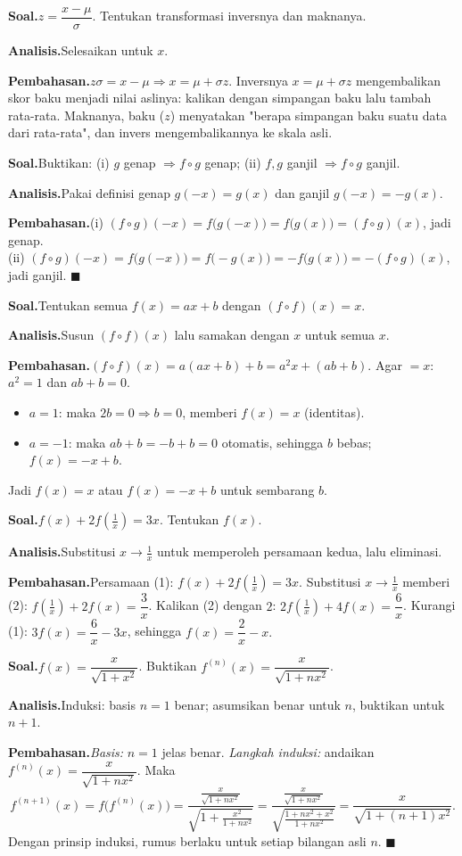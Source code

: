 \documentclass[11pt,a4paper]{report}
\theoremstyle{gaya}
\newcommand{\knomor}[1]{\par\medskip\noindent{\bfseries\color{ungu}#1}\par\nopagebreak}
\newcommand{\ksoal}{\noindent\textbf{\color{biru}Soal.}\space}
\newcommand{\kanalisis}{\par\noindent\textbf{\color{oranye}Analisis.}\space}
\newcommand{\kbahas}{\par\noindent\textbf{\color{hijau}Pembahasan.}\space}
\newcommand{\kbagian}[1]{\par\medskip\noindent{\large\bfseries\color{biru}#1}\par\smallskip}
\begin{document}
\knomor{D.4}
\ksoal $z=\dfrac{x-\mu}{\sigma}$. Tentukan transformasi inversnya dan maknanya.
\kanalisis Selesaikan untuk $x$.
\kbahas $z\sigma=x-\mu\Rightarrow x=\mu+\sigma z$. Inversnya $x=\mu+\sigma z$ mengembalikan skor baku menjadi nilai aslinya: kalikan dengan simpangan baku lalu tambah rata-rata. Maknanya, baku ($z$) menyatakan "berapa simpangan baku suatu data dari rata-rata", dan invers mengembalikannya ke skala asli.

\knomor{D.5}
\ksoal Buktikan: (i) $g$ genap $\Rightarrow f\circ g$ genap; (ii) $f,g$ ganjil $\Rightarrow f\circ g$ ganjil.
\kanalisis Pakai definisi genap $g(-x)=g(x)$ dan ganjil $g(-x)=-g(x)$.
\kbahas (i) $(f\circ g)(-x)=f\big(g(-x)\big)=f\big(g(x)\big)=(f\circ g)(x)$, jadi genap. \\
(ii) $(f\circ g)(-x)=f\big(g(-x)\big)=f\big(-g(x)\big)=-f\big(g(x)\big)=-(f\circ g)(x)$, jadi ganjil. $\blacksquare$

\kbagian{Challenge Corner}

\knomor{1}
\ksoal Tentukan semua $f(x)=ax+b$ dengan $(f\circ f)(x)=x$.
\kanalisis Susun $(f\circ f)(x)$ lalu samakan dengan $x$ untuk semua $x$.
\kbahas $(f\circ f)(x)=a(ax+b)+b=a^2x+(ab+b)$. Agar $=x$: $a^2=1$ dan $ab+b=0$.
\begin{itemize}[leftmargin=*,topsep=2pt]
  \item $a=1$: maka $2b=0\Rightarrow b=0$, memberi $f(x)=x$ (identitas).
  \item $a=-1$: maka $ab+b=-b+b=0$ otomatis, sehingga $b$ bebas; $f(x)=-x+b$.
\end{itemize}
Jadi $f(x)=x$ atau $f(x)=-x+b$ untuk sembarang $b$.

\knomor{2}
\ksoal $f(x)+2f\!\left(\tfrac1x\right)=3x$. Tentukan $f(x)$.
\kanalisis Substitusi $x\to\tfrac1x$ untuk memperoleh persamaan kedua, lalu eliminasi.
\kbahas Persamaan (1): $f(x)+2f\!\left(\tfrac1x\right)=3x$. Substitusi $x\to\tfrac1x$ memberi (2): $f\!\left(\tfrac1x\right)+2f(x)=\dfrac3x$. Kalikan (2) dengan $2$: $2f\!\left(\tfrac1x\right)+4f(x)=\dfrac6x$. Kurangi (1): $3f(x)=\dfrac6x-3x$, sehingga $f(x)=\dfrac2x-x.$

\knomor{3}
\ksoal $f(x)=\dfrac{x}{\sqrt{1+x^2}}$. Buktikan $f^{(n)}(x)=\dfrac{x}{\sqrt{1+nx^2}}$.
\kanalisis Induksi: basis $n=1$ benar; asumsikan benar untuk $n$, buktikan untuk $n+1$.
\kbahas \emph{Basis:} $n=1$ jelas benar. \emph{Langkah induksi:} andaikan $f^{(n)}(x)=\dfrac{x}{\sqrt{1+nx^2}}$. Maka
\[
f^{(n+1)}(x)=f\!\big(f^{(n)}(x)\big)=\frac{\frac{x}{\sqrt{1+nx^2}}}{\sqrt{1+\frac{x^2}{1+nx^2}}}
=\frac{\frac{x}{\sqrt{1+nx^2}}}{\sqrt{\frac{1+nx^2+x^2}{1+nx^2}}}
=\frac{x}{\sqrt{1+(n+1)x^2}}.
\]
Dengan prinsip induksi, rumus berlaku untuk setiap bilangan asli $n$. $\blacksquare$
\end{document}
